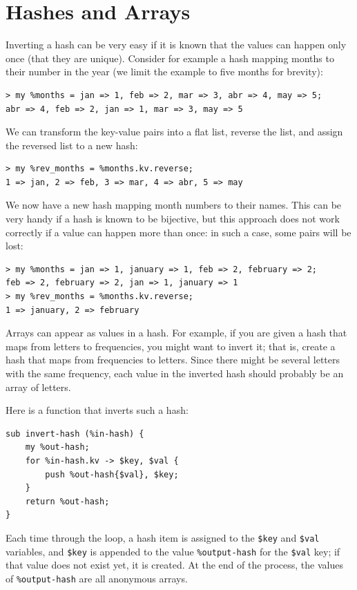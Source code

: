 \section{Hashes and Arrays}
\label{invert}

Inverting a hash can be very easy if it is known that the 
values can happen only once (that they are unique). Consider 
for example a hash mapping months to their number in the year 
(we limit the example to five months for brevity):

\begin{verbatim}
> my %months = jan => 1, feb => 2, mar => 3, abr => 4, may => 5;
abr => 4, feb => 2, jan => 1, mar => 3, may => 5
\end{verbatim}
%

We can transform the key-value pairs into a flat list, 
reverse the list, and assign the reversed list to a new 
hash:

\begin{verbatim}
> my %rev_months = %months.kv.reverse;
1 => jan, 2 => feb, 3 => mar, 4 => abr, 5 => may
\end{verbatim}
%

We now have a new hash mapping month numbers to their names.
This can be very handy if a hash is known to be bijective, but this approach does not work correctly if a value can 
happen more than once: in such a case, some pairs will be 
lost:

\begin{verbatim}
> my %months = jan => 1, january => 1, feb => 2, february => 2;
feb => 2, february => 2, jan => 1, january => 1
> my %rev_months = %months.kv.reverse;
1 => january, 2 => february
\end{verbatim}

Arrays can appear as values in a hash.  For example, if you
are given a hash that maps from letters to frequencies, you
might want to invert it; that is, create a hash that maps
from frequencies to letters.  Since there might be several 
letters with the same frequency, each value in the inverted hash 
should probably be an array of letters.

Here is a function that inverts such a hash:

\begin{verbatim}
sub invert-hash (%in-hash) { 
    my %out-hash; 
    for %in-hash.kv -> $key, $val {
        push %out-hash{$val}, $key; 
    }
    return %out-hash;
}
\end{verbatim}
%
Each time through the loop, a hash item is assigned to the  \verb'$key' and \verb'$val' variables, and \verb'$key' is 
appended to the value \verb'%output-hash' for the \verb'$val' 
key; if that value does not exist yet, it is created. At 
the end of the process, the values of \verb'%output-hash' are 
all anonymous arrays.

